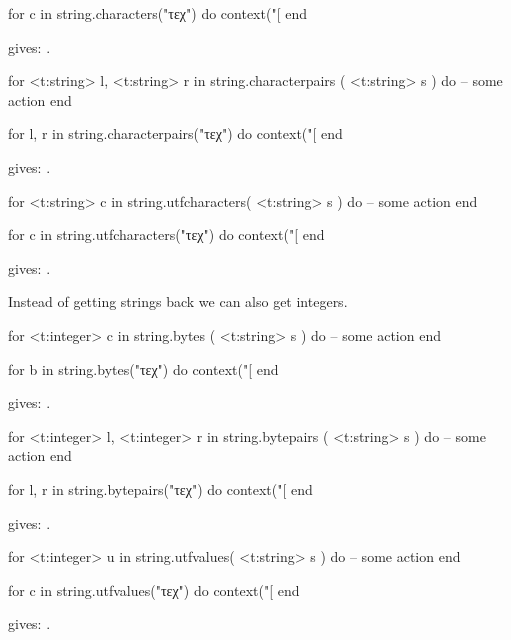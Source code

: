 \startbuffer
\startluacode
for c in string.characters("τεχ") do
    context("[%
end
\stopluacode
\stopbuffer

\typebuffer

gives: \inlinebuffer.

\starttyping[option=LUA]
for <t:string> l, <t:string> r in string.characterpairs ( <t:string> s ) do
    -- some action
end
\stoptyping

\startbuffer
\startluacode
for l, r in string.characterpairs("τεχ") do
    context("[%
end
\stopluacode
\stopbuffer

\typebuffer

gives: \inlinebuffer.

\starttyping[option=LUA]
for <t:string> c in string.utfcharacters( <t:string> s ) do
    -- some action
end
\stoptyping

\startbuffer
\startluacode
for c in string.utfcharacters("τεχ") do
    context("[%
end
\stopluacode
\stopbuffer

\typebuffer

gives: \inlinebuffer.

Instead of getting strings back we can also get integers.

\starttyping[option=LUA]
for <t:integer> c in string.bytes ( <t:string> s ) do
    -- some action
end
\stoptyping

\startbuffer
\startluacode
for b in string.bytes("τεχ") do
    context("[%
end
\stopluacode
\stopbuffer

\typebuffer

gives: \inlinebuffer.

\starttyping[option=LUA]
for <t:integer> l, <t:integer> r in string.bytepairs ( <t:string> s ) do
    -- some action
end
\stoptyping

\startbuffer
\startluacode
for l, r in string.bytepairs("τεχ") do
    context("[%
end
\stopluacode
\stopbuffer

\typebuffer

gives: \inlinebuffer.

\starttyping[option=LUA]
for <t:integer> u in string.utfvalues( <t:string> s ) do
    -- some action
end
\stoptyping

\startbuffer
\startluacode
for c in string.utfvalues("τεχ") do
    context("[%
end
\stopluacode
\stopbuffer

\typebuffer

gives: \inlinebuffer.

